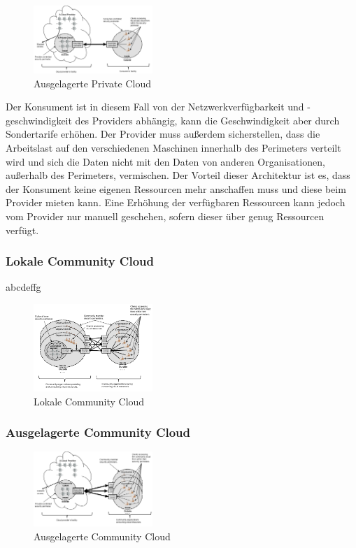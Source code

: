 \begin{figure}[H]
    \centering
	\includegraphics[width=0.4\textwidth]{Images/OutSourcedPrivateCloud}
	\caption{Ausgelagerte Private Cloud \cite{Badger}}
	\label{OutSourcedPrivateCloud}
\end{figure}

Der Konsument ist in diesem Fall von der Netzwerkverfügbarkeit und -geschwindigkeit des Providers abhängig, kann die Geschwindigkeit aber durch Sondertarife erhöhen.
Der Provider muss außerdem sicherstellen, dass die Arbeitslast auf den verschiedenen Maschinen innerhalb des Perimeters verteilt wird und sich die Daten 
nicht mit den Daten von anderen Organisationen, außerhalb des Perimeters, vermischen.
Der Vorteil dieser Architektur ist es, dass der Konsument keine eigenen Ressourcen mehr anschaffen muss und diese beim Provider mieten kann.
Eine Erhöhung der verfügbaren Ressourcen kann jedoch vom Provider nur manuell geschehen, sofern dieser über genug Ressourcen verfügt. 



\subsubsection{Lokale Community Cloud}
abcdeffg
\begin{figure}[H]
    \centering
	\includegraphics[width=0.4\textwidth]{Images/On-siteCommunityCloud}
	\caption{Lokale Community Cloud \cite{Badger}}
	\label{On-siteCommunityCloud}
\end{figure}



\subsubsection{Ausgelagerte Community Cloud}
\begin{figure}[H]
    \centering
	\includegraphics[width=0.4\textwidth]{Images/OutSourcedCommunityCloud}
	\caption{Ausgelagerte Community Cloud \cite{Badger}}
	\label{OutSourcedCommunityCloud}
\end{figure}


